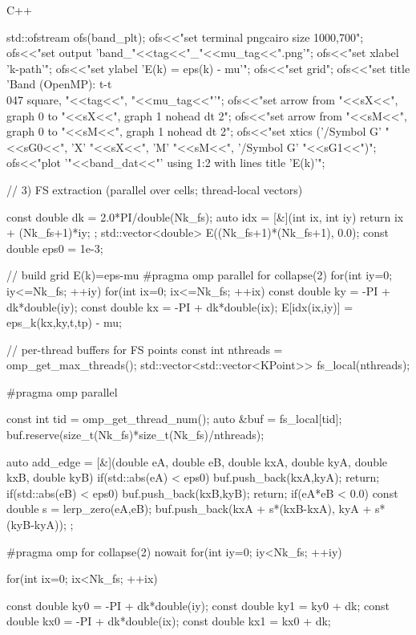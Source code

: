 \documentclass[12pt]{jreport}
\begin{document}
\begin{codebox}{C++}
{{        std::ofstream ofs(band_plt);
        ofs<<"set terminal pngcairo size 1000,700\n";
        ofs<<"set output 'band_"<<tag<<"_"<<mu_tag<<".png'\n";
        ofs<<"set xlabel 'k-path'\n";
        ofs<<"set ylabel 'E(k) = eps(k) - mu'\n";
        ofs<<"set grid\n";
        ofs<<"set title 'Band (OpenMP): t-t\\047 square, "<<tag<<", "<<mu_tag<<"'\n";
        ofs<<"set arrow from "<<sX<<", graph 0 to "<<sX<<", graph 1 nohead dt 2\n";
        ofs<<"set arrow from "<<sM<<", graph 0 to "<<sM<<", graph 1 nohead dt 2\n";
        ofs<<"set xtics ('{/Symbol G}' "<<sG0<<", 'X' "<<sX<<", 'M' "<<sM<<", '{/Symbol G}' "<<sG1<<")\n";
        ofs<<"plot '"<<band_dat<<"' using 1:2 with lines title 'E(k)'\n";
    }

    // 3) FS extraction (parallel over cells; thread-local vectors)
    {
        const double dk = 2.0*PI/double(Nk_fs);
        auto idx = [&](int ix, int iy){ return ix + (Nk_fs+1)*iy; };
        std::vector<double> E((Nk_fs+1)*(Nk_fs+1), 0.0);
        const double eps0 = 1e-3;

        // build grid E(k)=eps-mu
#pragma omp parallel for collapse(2)
        for(int iy=0; iy<=Nk_fs; ++iy){
            for(int ix=0; ix<=Nk_fs; ++ix){
                const double ky = -PI + dk*double(iy);
                const double kx = -PI + dk*double(ix);
                E[idx(ix,iy)] = eps_k(kx,ky,t,tp) - mu;
            }
        }

        // per-thread buffers for FS points
        const int nthreads = omp_get_max_threads();
        std::vector<std::vector<KPoint>> fs_local(nthreads);

#pragma omp parallel
        {
            const int tid = omp_get_thread_num();
            auto &buf = fs_local[tid];
            buf.reserve(size_t(Nk_fs)*size_t(Nk_fs)/nthreads);

            auto add_edge = [&](double eA, double eB, double kxA, double kyA, double kxB, double kyB){
                if(std::abs(eA) < eps0){ buf.push_back({kxA,kyA}); return; }
                if(std::abs(eB) < eps0){ buf.push_back({kxB,kyB}); return; }
                if(eA*eB < 0.0){
                    const double s = lerp_zero(eA,eB);
                    buf.push_back({kxA + s*(kxB-kxA), kyA + s*(kyB-kyA)});
                }
            };

#pragma omp for collapse(2) nowait
            for(int iy=0; iy<Nk_fs; ++iy){
                for(int ix=0; ix<Nk_fs; ++ix){
                    const double ky0 = -PI + dk*double(iy);
                    const double ky1 = ky0 + dk;
                    const double kx0 = -PI + dk*double(ix);
                    const double kx1 = kx0 + dk;

}}}}}
\end{codebox}
\end{document}
